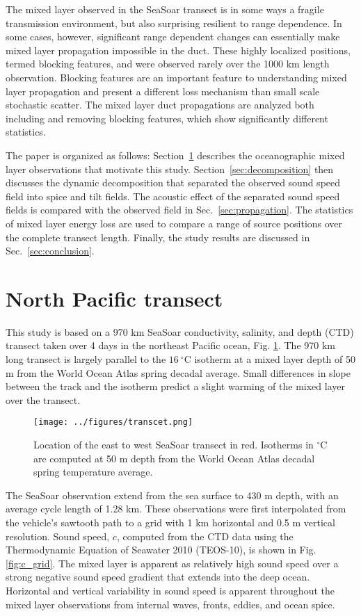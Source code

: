 \documentclass[preprint,NumberedRefs]{JASA}
\begin{document}
The mixed layer observed in the SeaSoar transect is in some ways a fragile transmission environment, but also surprising resilient to range dependence. In some cases, however, significant range dependent changes can essentially make mixed layer propagation impossible in the duct. These highly localized positions, termed blocking features, and were observed rarely over the 1000 km length observation. Blocking features are an important feature to understanding mixed layer propagation and present a different loss mechanism than small scale stochastic scatter. The mixed layer duct propagations are analyzed both including and removing blocking features, which show significantly different statistics.

The paper is organized as follows: Section~\ref{sec:transcet} describes the oceanographic mixed layer observations that motivate this study. Section~\ref{sec:decomposition} then discusses the dynamic decomposition that separated the observed sound speed field into spice and tilt fields. The acoustic effect of the separated sound speed fields is compared with the observed field in Sec.~\ref{sec:propagation}. The statistics of mixed layer energy loss are used to compare a range of source positions over the complete transect length. Finally, the study results are discussed in Sec.~\ref{sec:conclusion}.

\section{North Pacific transect}\label{sec:transcet}
This study is based on a 970 km SeaSoar conductivity, salinity, and depth (CTD) transect taken over 4 days in the northeast Pacific ocean\citep{cole2010seasonal}, Fig. \ref{fig:transcet}. The 970 km long transect is largely parallel to the $16 \ ^\circ$C isotherm at a mixed layer depth of 50 m from the World Ocean Atlas spring decadal average. Small differences in slope between the track and the isotherm predict a slight warming of the mixed layer over the transect.

\begin{figure}
\texttt{[image: ../figures/transcet.png]}
    \caption{\label{fig:transcet}{Location of the east to west SeaSoar transect in red. Isotherms in $^\circ$C are computed at 50 m depth from the World Ocean Atlas decadal spring temperature average.}}
\end{figure}

The SeaSoar observation\citep{colosi2020observations} extend from the sea surface to 430 m depth, with an average cycle length of 1.28 km. These observations were first interpolated from the vehicle's sawtooth path to a grid with 1 km horizontal and 0.5 m vertical resolution. Sound speed, $c$, computed from the CTD data using the Thermodynamic Equation of Seawater 2010 (TEOS-10), is shown in Fig. \ref{fig:c_grid}. The mixed layer is apparent as relatively high sound speed over a strong negative sound speed gradient that extends into the deep ocean. Horizontal and vertical variability in sound speed is apparent throughout the mixed layer observations from internal waves, fronts, eddies, and ocean spice\citep{colosi2020observations}.
\end{document}
